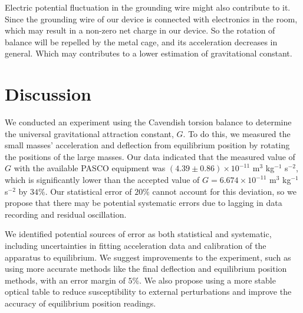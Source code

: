 \documentclass[a4paper]{tufte-handout}
\begin{document}
Electric potential fluctuation in the grounding wire might also contribute to it. Since the grounding wire of our device is connected with electronics in the room, which may result in a non-zero net charge in our device. So the rotation of balance will be repelled by the metal cage, and its acceleration decreases in general. Which may contributes to a lower estimation of gravitational constant. 


\newpage
\section{Discussion}

We conducted an experiment using the Cavendish torsion balance to determine the universal gravitational attraction constant, $G$. To do this, we measured the small masses' acceleration and deflection from equilibrium position by rotating the positions of the large masses. Our data indicated that the measured value of $G$ with the available PASCO equipment was $(4.39 \pm 0.86) \times 10^{-11}$ m$^3$ kg$^{-1}$ s$^{-2}$, which is significantly lower than the accepted value of $G = 6.674 \times 10^{-11}$ m$^3$ kg$^{-1}$ s$^{-2}$ by $34\%$. Our statistical error of $20\%$ cannot account for this deviation, so we propose that there may be potential systematic errors due to lagging in data recording and residual oscillation.

We identified potential sources of error as both statistical and systematic, including uncertainties in fitting acceleration data and calibration of the apparatus to equilibrium. We suggest improvements to the experiment, such as using more accurate methods like the final deflection and equilibrium position methods, with an error margin of $5\%$. We also propose using a more stable optical table to reduce susceptibility to external perturbations and improve the accuracy of equilibrium position readings.




% 
% 
\end{document}
